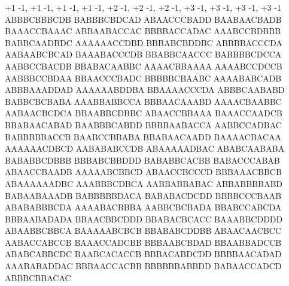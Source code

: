 +1 -1, +1 -1, +1 -1, +1 -1, +2 -1, +2 -1, +2 -1, +3 -1, +3 -1, +3 -1, +3 -1
ABBBCBBBCDB
BABBBCBDCAD
ABAACCCBADD
BAABAACBADB
BAAACCBAAAC
ABBAABACCAC
BBBBACCADAC
AAABCCBDBBB
BABBCAADBDC
AAAAAACCDBD
BBBABCBDDBC
ABBBBACCCDA
AABAABCBCAD
BAAABACCCDB
BBABBCAACCC
BABBBBCDCCA
AABBCCBACDB
BBABACAABBC
AAAACBBAAAA
AAAABCCDCCB
AABBBCCBDAA
BBAACCCBADC
BBBBBCBAABC
AAAABABCADB
ABBBAAADDAD
AAAAAABDDBA
BBAAAACCCDA
ABBBCAABABD
BABBCBCBABA
AAABBABBCCA
BBBAACAAABD
AAAACBAABBC
AABAACBCDCA
BBAABBCDBBC
ABAACCBBAAA
BAAACCAADCB
BBABAACABAD
BAABBBCABDD
BBBBAABACCA
AABBCCADBAC
BABBBBBACCB
BAABCCBBABA
BBABAACAADD
BAAAACBACAA
AAAAAACDBCD
AABABABCCDB
ABAAAAADBAC
ABABCAABABA
BABABBCDBBB
BBBABCBBDDD
BABABBCACBB
BABACCCABAB
ABAACCBAADB
AAAAABCBBCD
ABAACCBCCCD
BBBAAACBBCB
ABAAAAAADBC
AAABBBCDBCA
AABBABBABAC
ABBABBBBABD
BABAABAAADB
BABBBBBDACA
BABABACDCDD
BBBBCCCBAAB
ABABABBBCDA
AAAABACBBBA
AABBCBCBADA
BBABCCABCDA
BBBAABADADA
BBAACBBCDDD
BBABACBCACC
BAAABBCDDDD
ABAABBCBBCA
BAAAAABCBCB
BBABABCDDBB
ABAACAACBCC
AABACCABCCB
BAAACCADCBB
BBBAABCBDAD
BBAABBADCCB
ABABCABBCDC
BAABCACACCB
BBBACABDCDD
BBBBAACADAD
AAABABADDAC
BBBAACCACBB
BBBBBBABBDD
BABAACCADCD
ABBBCBBACAC
